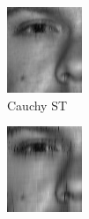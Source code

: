 \begin{figure}
\captionsetup[sub]{font=scriptsize}
\begin{subfigure}[b]{.19\linewidth}
\includegraphics[width = \linewidth]{DN_yale/yale_03_1_cauchy_st_fsim} 
\caption{Cauchy ST}
\end{subfigure}\hfill
\begin{subfigure}[b]{.19\linewidth}
\includegraphics[width = \linewidth]{DN_yale/yale_03_1_welsh_st_fsim} 

\end{subfigure}
\end{figure}

